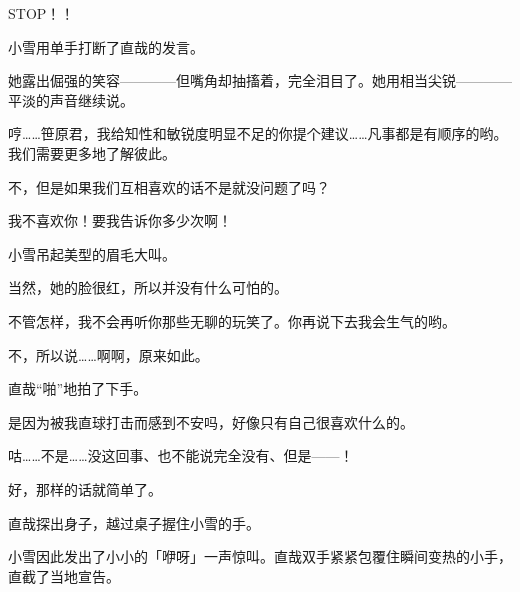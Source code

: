 STOP！！

小雪用单手打断了直哉的发言。

她露出倔强的笑容————但嘴角却抽搐着，完全泪目了。她用相当尖锐————平淡的声音继续说。

哼……笹原君，我给知性和敏锐度明显不足的你提个建议……凡事都是有顺序的哟。我们需要更多地了解彼此。

不，但是如果我们互相喜欢的话不是就没问题了吗？

我不喜欢你！要我告诉你多少次啊！

小雪吊起美型的眉毛大叫。

当然，她的脸很红，所以并没有什么可怕的。

不管怎样，我不会再听你那些无聊的玩笑了。你再说下去我会生气的哟。

不，所以说……啊啊，原来如此。

直哉“啪”地拍了下手。

是因为被我直球打击而感到不安吗，好像只有自己很喜欢什么的。

咕……不是……没这回事、也不能说完全没有、但是——！

好，那样的话就简单了。

直哉探出身子，越过桌子握住小雪的手。

小雪因此发出了小小的「咿呀」一声惊叫。直哉双手紧紧包覆住瞬间变热的小手，直截了当地宣告。

